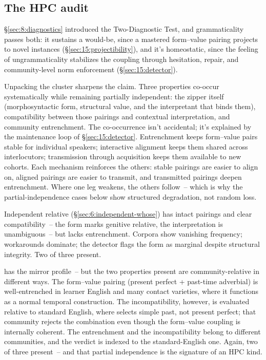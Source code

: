 \subsection{The HPC audit}
\label{sec:15:hpc-audit}
§\ref{sec:8:diagnostics} introduced the Two-Diagnostic Test, and grammaticality passes both: it sustains a would-be, since a mastered form--value pairing projects to novel instances (§\ref{sec:15:projectibility}), and it's homeostatic, since the feeling of ungrammaticality stabilizes the coupling through hesitation, repair, and community-level norm enforcement (§\ref{sec:15:detector}).

Unpacking the cluster sharpens the claim. Three properties co-occur systematically while remaining partially independent: the zipper itself (morphosyntactic form, structural value, and the interpretant that binds them), compatibility between those pairings and contextual interpretation, and community entrenchment. The co-occurrence isn't accidental; it's explained by the maintenance loop of §\ref{sec:15:detector}. Entrenchment keeps form--value pairs stable for individual speakers; interactive alignment keeps them shared across interlocutors; transmission through acquisition keeps them available to new cohorts. Each mechanism reinforces the others: stable pairings are easier to align on, aligned pairings are easier to transmit, and transmitted pairings deepen entrenchment. Where one leg weakens, the others follow~-- which is why the partial-independence cases below show structured degradation, not random loss.

Independent relative  (§\ref{sec:6:independent-whose}) has intact pairings and clear compatibility~-- the form marks genitive relative, the interpretation is unambiguous~-- but lacks entrenchment. Corpora show vanishing frequency; workarounds dominate; the detector flags the form as marginal despite structural integrity. Two of three present.

\ungram{} has the mirror profile~-- but the two properties present are community-relative in different ways. The form--value pairing (present perfect + past-time adverbial) is well-entrenched in learner English and many contact varieties, where it functions as a normal temporal construction. The incompatibility, however, is evaluated relative to standard English, where  selects simple past, not present perfect; that community rejects the combination even though the form--value coupling is internally coherent. The entrenchment and the incompatibility belong to different communities, and the  verdict is indexed to the standard-English one. Again, two of three present~-- and that partial independence is the signature of an HPC kind.

